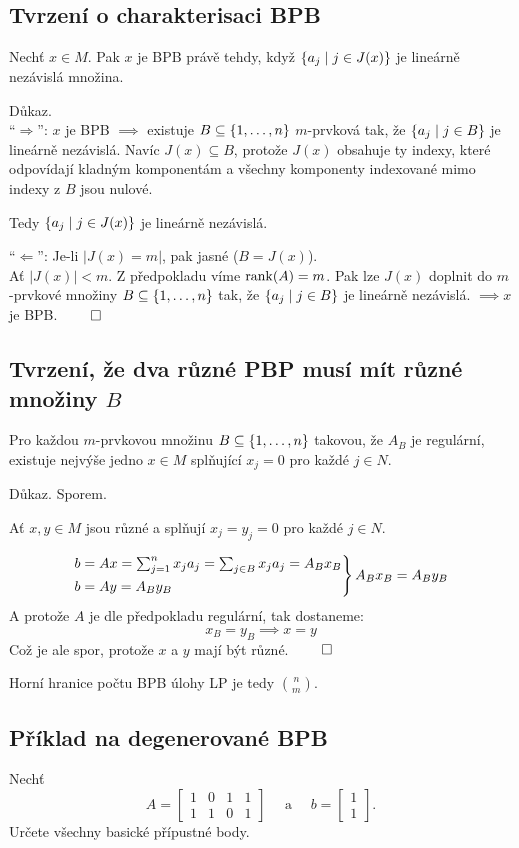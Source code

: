 \subsection{Tvrzení o charakterisaci BPB}\label{charBPB}
Nechť $x \in M$. Pak $x$ je BPB právě tehdy, když $\left\lbrace a_j \mid j \in J(x) \right\rbrace$ je lineárně nezávislá množina.

Důkaz.\\
\enquote{$\Rightarrow$}: $x$ je BPB $\implies$ existuje $B \subseteq \left\lbrace 1, \dots, n \right\rbrace$ $m$-prvková tak, že 
$\left\lbrace a_j \mid j \in B \right\rbrace$ je lineárně nezávislá. Navíc $J(x) \subseteq B$, protože $J(x)$ obsahuje ty indexy, které 
odpovídají kladným komponentám a všechny komponenty indexované mimo indexy z $B$ jsou nulové. 

Tedy $\left\lbrace a_j \mid j \in J(x) \right\rbrace$ je lineárně nezávislá.

\enquote{$\Leftarrow$}: Je-li $|J(x) = m|$, pak jasné ($B = J(x)$).\\
Ať $|J(x)| < m$. Z předpokladu víme $\operatorname{rank}(A) = m$. Pak lze $J(x)$ doplnit do $m$-prvkové množiny 
$B \subseteq \left\lbrace 1,\dots, n \right\rbrace$ tak, že $\left\lbrace a_j \mid j \in B \right\rbrace$ je lineárně nezávislá. $\implies x$ je BPB. $\qed$

\subsection{Tvrzení, že dva různé PBP musí mít různé množiny \texorpdfstring{$B$}{B}} \label{ruzneBPB}
Pro každou $m$-prvkovou množinu $B \subseteq \left\lbrace 1, \dots, n \right\rbrace$ takovou, že $A_B$ je regulární, existuje nejvýše jedno 
$x \in M$ splňující $x_j = 0$ pro každé $j \in N$.

Důkaz. Sporem.

Ať $x, y \in M$ jsou různé a splňují $x_j = y_j = 0$ pro každé $j \in N$.

\[
    \begin{rcases}
        b = Ax = \sum_{j = 1}^{n} x_j a_j = \sum_{j \in B}x_j a_j = A_B x_B \\
        b = Ay = A_B y_B
    \end{rcases} A_B x_B = A_B y_B
\]
A protože $A$ je dle předpokladu regulární, tak dostaneme:
\[
    x_B = y_B \implies x = y
\]
Což je ale spor, protože $x$ a $y$ mají být různé. $\qed$

Horní hranice počtu BPB úlohy LP je tedy $\binom{n}{m}$.

\subsection{Příklad na degenerované BPB}
Nechť 
\[
    A = 
    \begin{bmatrix}
    1 & 0 & 1 & 1 \\
    1 & 1 & 0 & 1
    \end{bmatrix} \quad \text{ a } \quad b = 
    \begin{bmatrix}
        1 \\
        1
    \end{bmatrix}.
\]
Určete všechny basické přípustné body.

